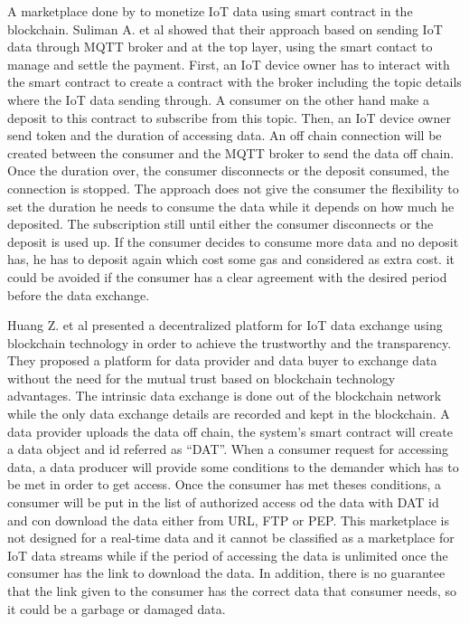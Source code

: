 \documentclass[letterpaper, 10 pt, conference]{ieeeconf}  %
\begin{document}
A marketplace done by \cite{19} to monetize IoT data using smart contract in the blockchain. Suliman A. et al \cite{19} showed that their approach based on sending IoT data through MQTT broker and at the top layer, using the smart contact to manage and settle the payment. First, an IoT device owner has to interact with the smart contract to create a contract with the broker including the topic details where the IoT data sending through. A consumer on the other hand make a deposit to this contract to subscribe from this topic. Then, an IoT device owner send token and the duration of accessing data. An off chain connection will be created between the consumer and the MQTT broker to send the data off chain. Once the duration over, the consumer disconnects or the deposit consumed, the connection is stopped. The approach does not give the consumer the flexibility to set the duration he needs to consume the data while it depends on how much he deposited. The subscription still until either the consumer disconnects or the deposit is used up. If the consumer decides to consume more data and no deposit has, he has to deposit again which cost some gas and considered as extra cost. it could be avoided if the consumer has a clear agreement with the desired period before the data exchange.

Huang Z. et al \cite{12} presented a decentralized platform for IoT data exchange using blockchain technology in order to achieve the trustworthy and the transparency. They proposed a platform for data provider and data buyer to exchange data without the need for the mutual trust based on blockchain technology advantages. The intrinsic data exchange is done out of the blockchain network while the only data exchange details are recorded and kept in the blockchain. A data provider uploads the data off chain, the system’s smart contract will create a data object and id referred as “DAT”. When a consumer request for accessing data, a data producer will provide some conditions to the demander which has to be met in order to get access. Once the consumer has met theses conditions, a consumer will be put in the list of authorized access od the data with DAT id and con download the data either from URL, FTP or PEP. This marketplace is not designed for a real-time data and it cannot be classified as a marketplace for IoT data streams while if the period of accessing the data is unlimited once the consumer has the link to download the data. In addition, there is no guarantee that the link given to the consumer has the correct data that consumer needs, so it could be a garbage or damaged data.   
	
\end{document}
